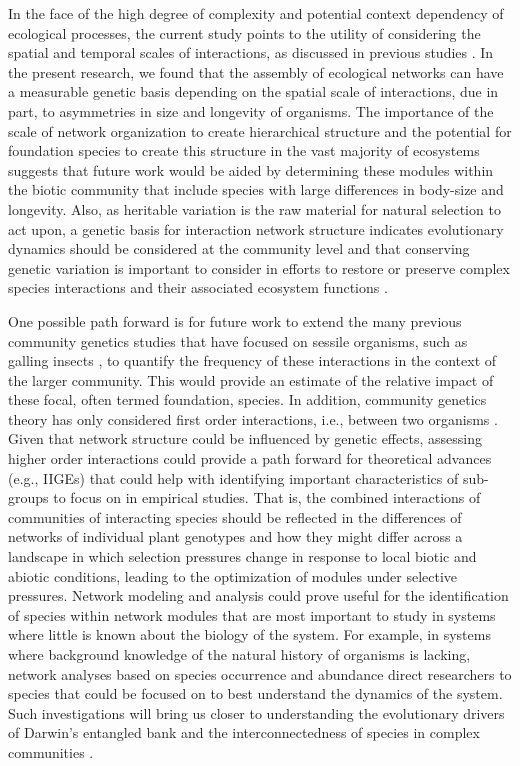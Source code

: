 \documentclass[fleqn,12pt]{olplainarticle}
\begin{document}
In the face of the high degree of complexity and potential context
dependency of ecological processes, the current study points to the
utility of considering the spatial and temporal scales of
interactions, as discussed in previous studies \citep{Bangert2006,
  Zook2010, Zytynska2012}. In the present research, we found that the
assembly of ecological networks can have a measurable genetic basis
depending on the spatial scale of interactions, due in part, to
asymmetries in size and longevity of organisms. The importance of the
scale of network organization to create hierarchical structure
\citep{Guimaraes2020TheOrganization} and the potential for foundation
species to create this structure in the vast majority of ecosystems
\citep{Ellison2005, Whitham2006a} suggests that future work would be
aided by determining these modules within the biotic community that
include species with large differences in body-size and
longevity. Also, as heritable variation is the raw material for
natural selection to act upon, a genetic basis for interaction network
structure indicates evolutionary dynamics should be considered at the
community level and that conserving genetic variation is important to
consider in efforts to restore or preserve complex species
interactions and their associated ecosystem functions
\citep{Evans2013}. 

One possible path forward is for future work to extend the many
previous community genetics studies that have focused on sessile
organisms, such as galling insects
\citep{Bailey2005ImportanceInteractions, Whitham2006a, Crutsinger2014,
  Smith2011, Keith2017}, to quantify the frequency of these
interactions in the context of the larger community. This would
provide an estimate of the relative impact of these focal, often
termed foundation, species. In addition, community genetics theory has
only considered first order interactions, i.e., between two organisms
\citep{Shuster2006COMMUNITYSTRUCTURE, Whitham2012,
  Whitham2020IntraspecificEvolution}. Given that network structure
could be influenced by genetic effects, assessing higher order
interactions could provide a path forward for theoretical advances
(e.g., IIGEs) that could help with identifying important
characteristics of sub-groups to focus on in empirical studies. That
is, the combined interactions of communities of interacting species
should be reflected in the differences of networks of individual plant
genotypes and how they might differ across a landscape in which
selection pressures change in response to local biotic and abiotic
conditions, leading to the optimization of modules under selective
pressures. Network modeling and analysis could prove useful for the
identification of species within network modules that are most
important to study in systems where little is known about the biology
of the system. For example, in systems where background knowledge of
the natural history of organisms is lacking, network analyses based on
species occurrence and abundance direct researchers to species that
could be focused on to best understand the dynamics of the
system. Such investigations will bring us closer to understanding the
evolutionary drivers of Darwin's entangled bank and the
interconnectedness of species in complex communities
\citep{Darwin1859, Dattilo2016}.
\end{document}
